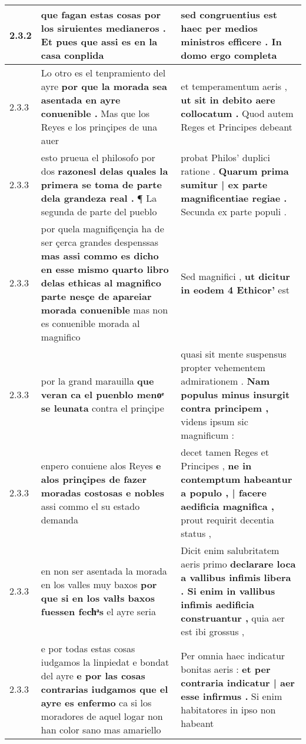 \begin{tabular}{|p{1cm}|p{6.5cm}|p{6.5cm}|}
2.3.2 & que fagan estas cosas \textbf{ por los siruientes medianeros . } Et pues que assi es en la casa conplida & sed congruentius est haec \textbf{ per medios ministros efficere . } In domo ergo completa \\\hline
2.3.3 & Lo otro es el tenpramiento del ayre \textbf{ por que la morada sea asentada en ayre conuenible . } Mas que los Reyes e los prinçipes de una auer & et temperamentum aeris , \textbf{ ut sit in debito aere collocatum . } Quod autem Reges et Principes debeant \\\hline
2.3.3 & esto prueua el philosofo por dos \textbf{ razonesl delas quales la primera se toma de parte dela grandeza real . } ¶ La segunda de parte del pueblo & probat Philos’ duplici ratione . \textbf{ Quarum prima sumitur | ex parte magnificentiae regiae . } Secunda ex parte populi . \\\hline
2.3.3 & por quela magnifiçençia ha de ser çerca grandes despenssas \textbf{ mas assi commo es dicho en esse mismo quarto libro delas ethicas al magnifico parte nesçe de apareiar morada conuenible } mas non es conuenible morada al magnifico & Sed magnifici , \textbf{ ut dicitur in eodem 4 Ethicor’ } est \\\hline
2.3.3 & por la grand marauilla \textbf{ que veran ca el puenblo menoͤ se leunata } contra el prinçipe & quasi sit mente suspensus propter vehementem admirationem . \textbf{ Nam populus minus insurgit contra principem , } videns ipsum sic magnificum : \\\hline
2.3.3 & enpero conuiene alos Reyes \textbf{ e alos prinçipes de fazer moradas costosas e nobles } assi commo el su estado demanda & decet tamen Reges et Principes , \textbf{ ne in contemptum habeantur a populo , | facere aedificia magnifica , } prout requirit decentia status , \\\hline
2.3.3 & en non ser asentada la morada en los valles muy baxos \textbf{ por que si en los valłs baxos fuessen fechͣs } el ayre seria & Dicit enim salubritatem aeris primo \textbf{ declarare loca a vallibus infimis libera . Si enim in vallibus infimis aedificia construantur , } quia aer est ibi grossus , \\\hline
2.3.3 & e por todas estas cosas iudgamos la linpiedat e bondat del ayre \textbf{ e por las cosas contrarias iudgamos que el ayre es enfermo } ca si los moradores de aquel logar non han color sano mas amariello & Per omnia haec indicatur bonitas aeris : \textbf{ et per contraria indicatur | aer esse infirmus . } Si enim habitatores in ipso non habeant \\\hline

\end{tabular}
